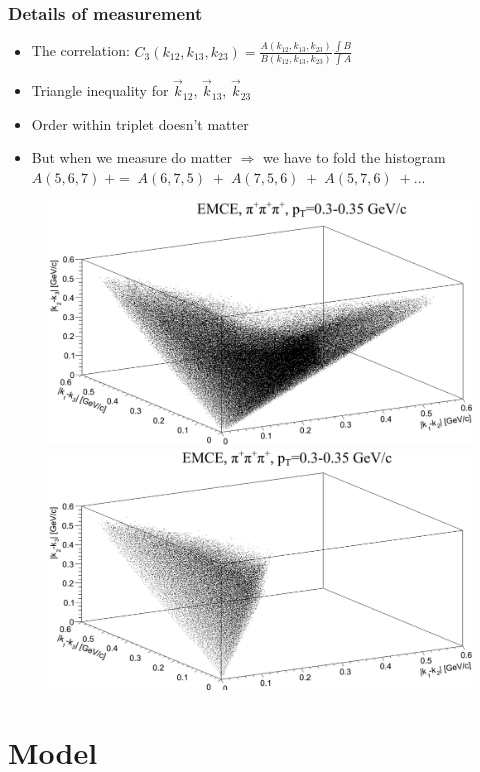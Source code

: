 \documentclass{beamer}
\begin{document}
\begin{frame}[noframenumbering]
\frametitle{Details of measurement}
\begin{itemize}
\setlength{\itemsep}{10pt}
\item The correlation:
$C_3(k_{12}, k_{13}, k_{23})=\frac{A(k_{12}, k_{13}, k_{23})}{B(k_{12}, k_{13}, k_{23})}\frac{\int B}{\int A}$
\item Triangle inequality for $\vec{k}_{12}$, $\vec{k}_{13}$, $\vec{k}_{23}$
\item Order within triplet doesn't matter
\item But when we measure do matter $\Rightarrow$ we have to fold the histogram
		$A(5,6,7) \;+=\; A(6,7,5)\; + \;A(7,5,6)\; + \;A(5,7,6)\; +...$
\end{itemize}
\begin{figure}
\includegraphics[scale=0.2]{pic/C1}
\includegraphics[scale=0.2]{pic/C2}
\end{figure}
\end{frame}

\section{Model}
\end{document}
